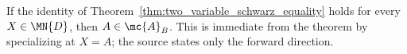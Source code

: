 \begin{corollary}
    \label{cor:two_variable_schwarz_equality_converse}
    \leanok
    If the identity of
    Theorem~\ref{thm:two_variable_schwarz_equality} holds for every
    $X\in\MN{D}$, then $A\in\mc{A}_B$. This is immediate from the
    theorem by specializing at $X=A$; the source states only the forward
    direction.
\end{corollary}
